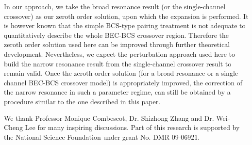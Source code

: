 \documentclass[reprint,pra]{revtex4-1}
\begin{document}


     In our approach, we take the broad resonance result (or the single-channel crossover) as our zeroth order solution, upon which the expansion is performed.  It is however known that the simple BCS-type pairing treatment is not adequate  to quantitatively describe the whole BEC-BCS crossover region.  Therefore the zeroth order solution used here can be improved through further theoretical development.  Nevertheless, we expect the perturbation approach used here to build the narrow resonance result from the single-channel crossover result to remain valid.  Once the zeroth order solution (for a broad resonance or a single channel BEC-BCS crossover model) is appropriately improved, the correction of the narrow resonance in such a parameter regime, can still be obtained by  a procedure similar to the one described in this paper.  


\begin{acknowledgements}
We thank  Professor Monique Combescot, Dr. Shizhong Zhang and  Dr. Wei-Cheng Lee for many inspiring discussions. Part of this research  is supported  by the National Science Foundation under grant No. DMR 09-06921. 

\end{acknowledgements}

\appendix
\end{document}
